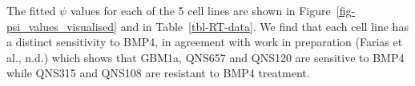\documentclass[
  default,
]{sn-jnl}
\begin{document}
The fitted \(\psi\) values for each of the 5 cell lines are shown in
Figure~\ref{fig-psi_values_visualised} and in Table~\ref{tbl-RT-data}.
We find that each cell line has a distinct sensitivity to BMP4, in
agreement with work in preparation (Farias et al., n.d.) which shows
that GBM1a, QNS657 and QNS120 are sensitive to BMP4 while QNS315 and
QNS108 are resistant to BMP4 treatment.

\begin{figure}

\begin{minipage}{0.50\linewidth}


\subcaption{\label{fig-sim_RT_assay_GBM1a}}

\end{minipage}%
%
\begin{minipage}{0.50\linewidth}

\end{minipage}
\end{figure}
\end{document}
